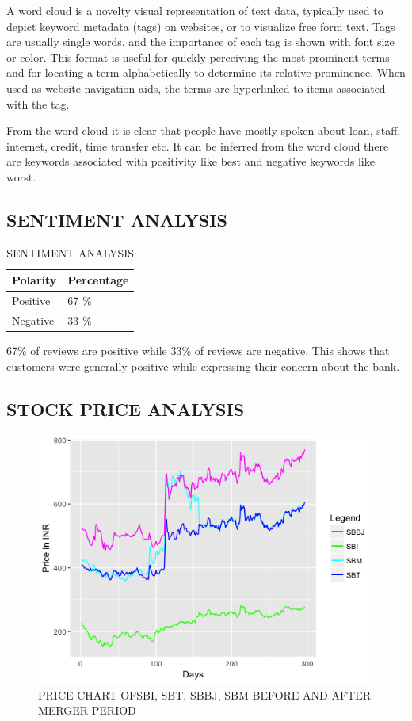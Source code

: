 \documentclass[a4paper, 12pt]{extarticle}
\begin{document}
{\par A word cloud is a novelty visual representation of text data, typically used to depict keyword metadata (tags) on websites, or to visualize free form text. Tags are usually single words, and the importance of each tag is shown with font size or color. This format is useful for quickly perceiving the most prominent terms and for locating a term alphabetically to determine its relative prominence. When used as website navigation aids, the terms are hyperlinked to items associated with the tag.

From the word cloud it is clear that people have mostly spoken about loan, staff, internet, credit, time transfer etc. It can be inferred from the word cloud there are keywords associated with positivity like best and negative keywords like worst.
\subsection{SENTIMENT ANALYSIS}
\begin{table}[H]
\centering
\begin{tabularx}{\linewidth}{|X|X|}
\hline Polarity & Percentage\\
\hline Positive & 67 \% \\
\hline Negative & 33 \% \\
\hline
\end{tabularx}
\caption{SENTIMENT ANALYSIS}
\label{table:sent_analysis}
\end{table}
67\% of reviews are positive while 33\% of reviews are negative. This shows that customers were generally positive while expressing their concern about the bank.
\subsection{STOCK PRICE ANALYSIS}
\begin{figure}[H]
\centering
\includegraphics[scale=0.8]{price_action.png}
\caption{PRICE CHART OFSBI, SBT, SBBJ, SBM BEFORE AND AFTER MERGER PERIOD}
\label{fig:price_action}
\end{figure}

}
\end{document}
